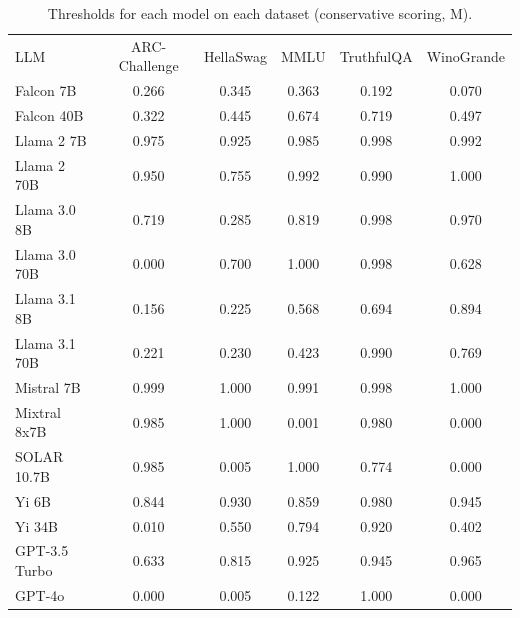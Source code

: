 \begin{table}[h]
\caption{Thresholds for each model on each dataset (conservative scoring, M). }
\label{tab:thresholds_prob_margin_k20_w2}
\centering
\begin{tabular}{l S[table-format=3.1] S[table-format=3.1] S[table-format=3.1] S[table-format=3.1] S[table-format=3.1]}
\toprule
LLM & ARC-Challenge & HellaSwag & MMLU & TruthfulQA & WinoGrande \\ 
\cmidrule(lr){1-1} \cmidrule(lr){2-2} \cmidrule(lr){3-3} \cmidrule(lr){4-4} \cmidrule(lr){5-5} \cmidrule(lr){6-6}
Falcon 7B & 0.266 & 0.345 & 0.363 & 0.192 & 0.070\\
Falcon 40B & 0.322 & 0.445 & 0.674 & 0.719 & 0.497\\
Llama 2 7B & 0.975 & 0.925 & 0.985 & 0.998 & 0.992\\
Llama 2 70B & 0.950 & 0.755 & 0.992 & 0.990 & 1.000\\
Llama 3.0 8B & 0.719 & 0.285 & 0.819 & 0.998 & 0.970\\
Llama 3.0 70B & 0.000 & 0.700 & 1.000 & 0.998 & 0.628\\
Llama 3.1 8B & 0.156 & 0.225 & 0.568 & 0.694 & 0.894\\
Llama 3.1 70B & 0.221 & 0.230 & 0.423 & 0.990 & 0.769\\
Mistral 7B & 0.999 & 1.000 & 0.991 & 0.998 & 1.000\\
Mixtral 8x7B & 0.985 & 1.000 & 0.001 & 0.980 & 0.000\\
SOLAR 10.7B & 0.985 & 0.005 & 1.000 & 0.774 & 0.000\\
Yi 6B & 0.844 & 0.930 & 0.859 & 0.980 & 0.945\\
Yi 34B & 0.010 & 0.550 & 0.794 & 0.920 & 0.402\\
GPT-3.5 Turbo & 0.633 & 0.815 & 0.925 & 0.945 & 0.965\\
GPT-4o & 0.000 & 0.005 & 0.122 & 1.000 & 0.000\\
\bottomrule
\end{tabular}
\end{table}
